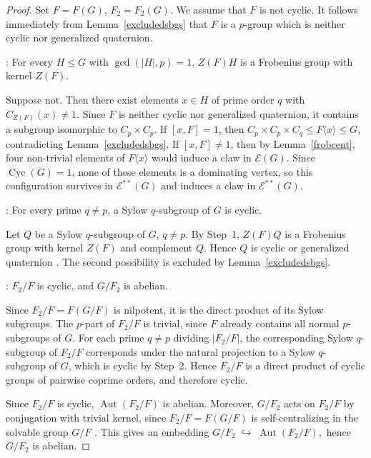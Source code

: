 \documentclass[preprint,11pt]{elsarticle}
\newcommand{\cyc}{\operatorname{Cyc}}
\begin{document}
\begin{proof}
	Set $F = F(G)$, $F_2 = F_2(G)$. We assume that $F$ is not cyclic.
	It follows immediately from Lemma~\ref{excludedsbgs} that $F$ is a $p$-group
	which is neither cyclic nor generalized quaternion.
	
	\medskip
	: For every $H \le G$ with $\gcd(|H|, p) = 1$, 
	$Z(F)H$ is a Frobenius group with kernel $Z(F)$.
	
Suppose not. Then there exist elements $x \in H$ of prime order $q$ 
with $C_{Z(F)}(x)\neq 1.$ Since $F$ is neither cyclic nor generalized 
quaternion, it contains a subgroup isomorphic to $C_p \times C_p$. 
If $[x,F]=1$, then $C_p \times C_p \times C_q \leq F\langle x\rangle 
\leq G$, contradicting Lemma~\ref{excludedsbgs}. If $[x,F]\neq 1$, 
then by Lemma~\ref{frobcent}, four non-trivial elements of 
$F\langle x\rangle$ would induce a claw in $\mathcal{E}(G)$.
Since $\cyc(G) = 1$, none of these elements is a dominating 
vertex, so this configuration survives in $\mathcal{E}^{**}(G)$ and
induces a claw in $\mathcal{E}^{**}(G)$.

	\medskip
	: For every prime $q \neq p$, a Sylow $q$-subgroup 
	of $G$ is cyclic.
	
	Let $Q$ be a Sylow $q$-subgroup of $G$, $q \neq p$. By Step~1, $Z(F)Q$ is 
	a Frobenius group with kernel $Z(F)$ and complement $Q$. Hence $Q$ is cyclic or generalized quaternion  \cite[V 8.7 Hauptsatz]{Endliche-gruppen-I-Huppert}. The 
	second possibility is excluded by Lemma~\ref{excludedsbgs}.
	
	\medskip
	: $F_2/F$ is cyclic, and $G/F_2$ is abelian.
	
	Since $F_2/F = F(G/F)$ is nilpotent, it is the direct product of its 
	Sylow subgroups. The $p$-part of $F_2/F$ is trivial, since $F$ already 
	contains all normal $p$-subgroups of $G$. For each prime $q \neq p$ 
	dividing $|F_2/F|$, the corresponding Sylow $q$-subgroup of $F_2/F$ 
	corresponds under the natural projection to a Sylow $q$-subgroup of $G$, 
	which is cyclic by Step~2. Hence $F_2/F$ is a direct product of cyclic 
	groups of pairwise coprime orders, and therefore cyclic.
	
	Since $F_2/F$ is cyclic, $\operatorname{Aut}(F_2/F)$ is abelian. Moreover, 
	$G/F_2$ acts on $F_2/F$ by conjugation with trivial kernel, since 
	$F_2/F = F(G/F)$ is self-centralizing in the solvable group $G/F$ 
\cite[III 4.2 Satz]{Endliche-gruppen-I-Huppert}. This gives an embedding
$
	G/F_2 \;\hookrightarrow\; \operatorname{Aut}(F_2/F),
$
	hence $G/F_2$ is abelian.
	

\end{proof}
\end{document}
